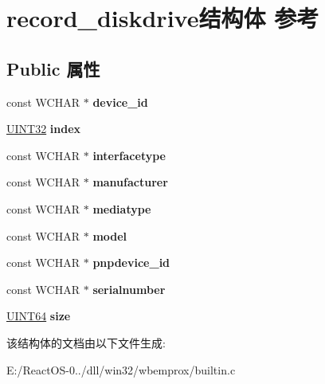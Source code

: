 \hypertarget{structrecord__diskdrive}{}\section{record\+\_\+diskdrive结构体 参考}
\label{structrecord__diskdrive}
\subsection*{Public 属性}
\begin{DoxyCompactItemize}
\item 
\mbox{\label{structrecord__diskdrive_a17ca204221a5b30c0f2e499c26a3c150}} 
const W\+C\+H\+AR $\ast$ {\bfseries device\+\_\+id}
\item 
\mbox{\label{structrecord__diskdrive_a73636097c9dc06610c38554517bb4a23}} 
\hyperlink{_processor_bind_8h_ae1e6edbbc26d6fbc71a90190d0266018}{U\+I\+N\+T32} {\bfseries index}
\item 
\mbox{\label{structrecord__diskdrive_ab50e0e29ad1d17177fcc442b0550de6d}} 
const W\+C\+H\+AR $\ast$ {\bfseries interfacetype}
\item 
\mbox{\label{structrecord__diskdrive_a2a72b2105add46ad1d81fc0ee6d4da6b}} 
const W\+C\+H\+AR $\ast$ {\bfseries manufacturer}
\item 
\mbox{\label{structrecord__diskdrive_ae134bc441cec8c667b0b58927e151002}} 
const W\+C\+H\+AR $\ast$ {\bfseries mediatype}
\item 
\mbox{\label{structrecord__diskdrive_aa7ad2e477a4a30d72cba2dbc810ef23f}} 
const W\+C\+H\+AR $\ast$ {\bfseries model}
\item 
\mbox{\label{structrecord__diskdrive_aad589268510ec9e0baef284b21568e40}} 
const W\+C\+H\+AR $\ast$ {\bfseries pnpdevice\+\_\+id}
\item 
\mbox{\label{structrecord__diskdrive_ab8d8006ee4a133737a931f14d2df93d6}} 
const W\+C\+H\+AR $\ast$ {\bfseries serialnumber}
\item 
\mbox{\label{structrecord__diskdrive_a086c136864573c0c397e3492e2b8385b}} 
\hyperlink{_processor_bind_8h_a57be03562867144161c1bfee95ca8f7c}{U\+I\+N\+T64} {\bfseries size}
\end{DoxyCompactItemize}


该结构体的文档由以下文件生成\+:\begin{DoxyCompactItemize}
\item 
E\+:/\+React\+O\+S-\/0../dll/win32/wbemprox/builtin.\+c\end{DoxyCompactItemize}
